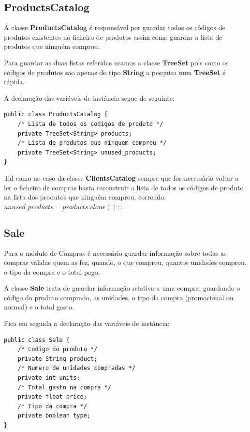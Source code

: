 \documentclass[10pt] {article}
\begin{document}
\subsection{ProductsCatalog}

A classe \textbf{ProductsCatalog} é responsável por guardar todos os códigos de produtos existentes no ficheiro de produtos assim como guardar a lista de produtos que ninguém comprou.

Para guardar as duas listas referidas usamos a classe \textbf{TreeSet} pois como os códigos de produtos são apenas do tipo \textbf{String} a pesquisa num \textbf{TreeSet} é rápida.

A declaração das variáveis de instância segue de seguinte:

\begin{lstlisting}
public class ProductsCatalog {
	/* Lista de todos os codigos de produto */
	private TreeSet<String> products;
	/* Lista de produtos que ninguem comprou */
	private TreeSet<String> unused_products;
}
\end{lstlisting}


Tal como no caso da classe \textbf{ClientsCatalog} sempre que for necessário voltar a ler o ficheiro de compras basta reconstruir a lista de todos os códigos de produto na lista dos produtos que ninguém comprou, correndo:
$unused\_products = products.clone();$.

\newpage
\subsection{Sale}

Para o módulo de Compras é necessário guardar informação sobre todas as compras válidas quem as fez, quando, o que comprou, quantos unidades comprou, o tipo da compra e o total pago.

A classe \textbf{Sale} trata de guardar informação relativa a uma compra, guardando o código do produto comprado, as unidades, o tipo da compra (promocional ou normal) e o total gasto.

Fica em seguida a declaração das variáveis de instância:

\begin{lstlisting}
public class Sale {
	/* Codigo do produto */
	private String product;
	/* Numero de unidades compradas */
	private int units;
	/* Total gasto na compra */
	private float price;
	/* Tipo da compra */
	private boolean type;
}
\end{lstlisting}
\end{document}
